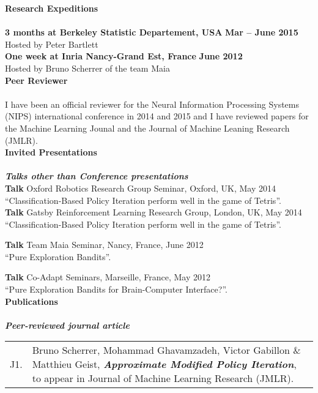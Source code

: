 \noindent\textbf{Research Expeditions}\\[-.4cm]\noindent\makebox[\linewidth]{\rule{\columnwidth}{0.4pt}}\\[.1cm]
\noindent\textbf{3 months at Berkeley Statistic Departement, USA} \hfill \textbf{Mar -- June 2015} \\
Hosted by Peter Bartlett\\
\noindent\textbf{One week at Inria Nancy-Grand Est, France} \hfill \textbf{June 2012} \\
Hosted by Bruno Scherrer of the team Maia\\

\noindent\textbf{Peer Reviewer}\\[-.4cm]\noindent\makebox[\linewidth]{\rule{\columnwidth}{0.4pt}}\\[.1cm]
I have been an official reviewer for the Neural Information Processing Systems (NIPS) international conference in 2014 and 2015 and I have reviewed papers for the Machine Learning Jounal and the Journal of Machine Leaning Research (JMLR).\\


\noindent 
\textbf{Invited Presentations}
\\[-.4cm]\noindent\makebox[\linewidth]{\rule{\columnwidth}{0.4pt}}\\[.1cm]
\textbf{\textit{Talks other than Conference presentations}}\\
\textbf{Talk} Oxford Robotics Research Group Seminar, Oxford, UK, May 2014\\
 ``Classification-Based Policy Iteration perform well in the game of Tetris''.\\
\noindent \textbf{Talk} Gatsby Reinforcement Learning Research Group, London, UK, May 2014\\
 ``Classification-Based Policy Iteration perform well in the game of Tetris''.
  
\noindent \textbf{Talk} Team Maia Seminar, Nancy, France, June 2012\\
 ``Pure Exploration Bandits''.
 
\noindent \textbf{Talk} Co-Adapt Seminars, Marseille, France,  May 2012\\
 ``Pure Exploration Bandits for Brain-Computer Interface?''.\\

\noindent\textbf{Publications}\\[-.4cm]\noindent\makebox[\linewidth]{\rule{\columnwidth}{0.4pt}}\\[.1cm]
\textit{\textbf{Peer-reviewed journal article}}\\
\noindent\begin{tabularx}{\columnwidth}{@{} l X @{}}
 J1. & Bruno Scherrer, Mohammad Ghavamzadeh, Victor Gabillon $\&$ Matthieu Geist, \textbf{\emph{Approximate Modified Policy Iteration}}, to appear in Journal of Machine Learning Research (JMLR).
  \end{tabularx}\\
  
